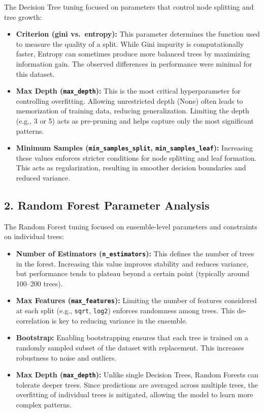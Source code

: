\documentclass[11pt]{article}
\begin{document}
The Decision Tree tuning focused on parameters that control node splitting and tree growth:

\begin{itemize}
    \item \textbf{Criterion (gini vs.\ entropy):} This parameter determines the function used to measure the quality of a split. While Gini impurity is computationally faster, Entropy can sometimes produce more balanced trees by maximizing information gain. The observed differences in performance were minimal for this dataset.
    
    \item \textbf{Max Depth (\texttt{max\_depth}):} This is the most critical hyperparameter for controlling overfitting. Allowing unrestricted depth (None) often leads to memorization of training data, reducing generalization. Limiting the depth (e.g., 3 or 5) acts as pre-pruning and helps capture only the most significant patterns.
    
    \item \textbf{Minimum Samples (\texttt{min\_samples\_split}, \texttt{min\_samples\_leaf}):} Increasing these values enforces stricter conditions for node splitting and leaf formation. This acts as regularization, resulting in smoother decision boundaries and reduced variance.
\end{itemize}

\subsection*{2. Random Forest Parameter Analysis}

The Random Forest tuning focused on ensemble-level parameters and constraints on individual trees:

\begin{itemize}
    \item \textbf{Number of Estimators (\texttt{n\_estimators}):} This defines the number of trees in the forest. Increasing this value improves stability and reduces variance, but performance tends to plateau beyond a certain point (typically around 100--200 trees).
    
    \item \textbf{Max Features (\texttt{max\_features}):} Limiting the number of features considered at each split (e.g., \texttt{sqrt}, \texttt{log2}) enforces randomness among trees. This de-correlation is key to reducing variance in the ensemble.
    
    \item \textbf{Bootstrap:} Enabling bootstrapping ensures that each tree is trained on a randomly sampled subset of the dataset with replacement. This increases robustness to noise and outliers.
    
    \item \textbf{Max Depth (\texttt{max\_depth}):} Unlike single Decision Trees, Random Forests can tolerate deeper trees. Since predictions are averaged across multiple trees, the overfitting of individual trees is mitigated, allowing the model to learn more complex patterns.
\end{itemize}
\end{document}

